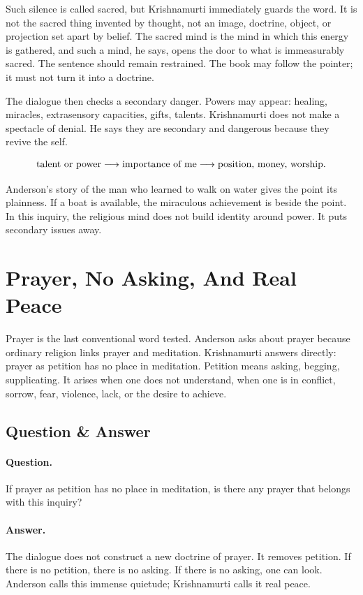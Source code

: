 \documentclass[11pt,oneside]{book}
\begin{document}
Such silence is called sacred, but Krishnamurti immediately guards the word. It is not the sacred thing invented by thought, not an image, doctrine, object, or projection set apart by belief. The sacred mind is the mind in which this energy is gathered, and such a mind, he says, opens the door to what is immeasurably sacred. The sentence should remain restrained. The book may follow the pointer; it must not turn it into a doctrine.

The dialogue then checks a secondary danger. Powers may appear: healing, miracles, extrasensory capacities, gifts, talents. Krishnamurti does not make a spectacle of denial. He says they are secondary and dangerous because they revive the self.

\begin{equation}
\hbox{talent or power}
\longrightarrow
\hbox{importance of me}
\longrightarrow
\hbox{position, money, worship}.
\end{equation}

Anderson's story of the man who learned to walk on water gives the point its plainness. If a boat is available, the miraculous achievement is beside the point. In this inquiry, the religious mind does not build identity around power. It puts secondary issues away.

\section{Prayer, No Asking, And Real Peace}

Prayer is the last conventional word tested. Anderson asks about prayer because ordinary religion links prayer and meditation. Krishnamurti answers directly: prayer as petition has no place in meditation. Petition means asking, begging, supplicating. It arises when one does not understand, when one is in conflict, sorrow, fear, violence, lack, or the desire to achieve.

\subsection{Question \& Answer}

\paragraph{Question.}
If prayer as petition has no place in meditation, is there any prayer that belongs with this inquiry?

\paragraph{Answer.}
The dialogue does not construct a new doctrine of prayer. It removes petition. If there is no petition, there is no asking. If there is no asking, one can look. Anderson calls this immense quietude; Krishnamurti calls it real peace.
\end{document}
